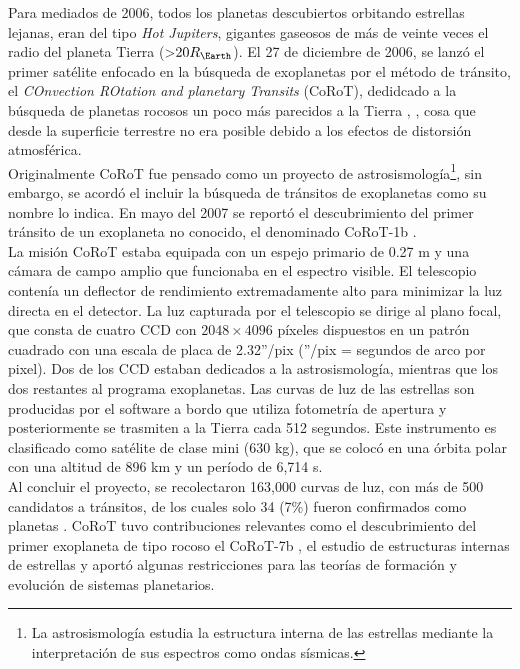 Para mediados de 2006, todos los planetas descubiertos orbitando estrellas lejanas, eran del tipo \textit{Hot Jupiters}, gigantes gaseosos de más de veinte veces el radio del planeta Tierra (>$20R_{\Earth}$). El 27 de diciembre de 2006, se lanzó el primer satélite enfocado en la búsqueda de exoplanetas por el método de tránsito, el \textit{COnvection ROtation and planetary Transits} (CoRoT), dedidcado a la búsqueda de planetas rocosos un poco más parecidos a la Tierra \cite{aigrain2007corot}, \cite{barge2007corot}, cosa que desde la superficie terrestre no era posible debido a los efectos de distorsión atmosférica.\\

Originalmente CoRoT fue pensado como un proyecto de astrosismología\footnote{La astrosismología estudia la estructura interna de las estrellas mediante la interpretación de sus espectros como ondas sísmicas.}, sin embargo, se acordó el incluir la búsqueda de tránsitos de exoplanetas como su nombre lo indica. En mayo del 2007 se reportó el descubrimiento del primer tránsito de un exoplaneta no conocido, el denominado CoRoT-1b \cite{barge2008transiting}. \\

La misión CoRoT estaba equipada con un espejo primario de 0.27 m  y una cámara de campo amplio que funcionaba en el espectro visible. El telescopio contenía un deflector de rendimiento extremadamente alto para minimizar la luz directa en el detector. La luz capturada por el telescopio se dirige al plano focal, que consta de cuatro CCD con $2048\times 4096$ píxeles dispuestos en un patrón cuadrado con una escala de placa de 2.32''/pix (''/pix = segundos de arco por pixel). Dos de los CCD estaban dedicados a la astrosismología, mientras que los dos restantes al programa exoplanetas. Las curvas de luz de las estrellas son producidas por el software a bordo que utiliza fotometría de apertura y posteriormente se trasmiten a la Tierra cada 512 segundos. Este instrumento es clasificado como satélite de clase mini (630 kg), que se colocó en una órbita polar con una altitud de 896 km y un período de 6,714 s.\\

Al concluir el proyecto, se recolectaron 163,000 curvas de luz, con más de 500 candidatos a tránsitos, de los cuales solo 34 (7\%) fueron confirmados como planetas \citep{moutou2013corot}. CoRoT tuvo contribuciones relevantes como el descubrimiento del primer exoplaneta de tipo rocoso el CoRoT-7b \citep{leger2009transiting}, el estudio de estructuras internas de estrellas y aportó algunas restricciones para las teorías de formación y evolución de sistemas planetarios.

